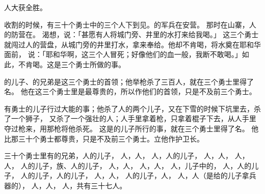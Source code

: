 {{{{}}}人大获全胜。
\par }{\PP {}收割的时候，有三十个勇士中的三个人下到{}见{}。{}的军兵在{}安营。
那时{}在山寨，{}人的防营在{}。
渴想，说：「甚愿有人将{}城门旁、井里的水打来给我喝。」
这三个勇士就闯过{}人的营盘，从{}城门旁的井里打水，拿来奉给{}。他却不肯喝，将水奠在耶和华面前，
说：「耶和华啊，这三个人冒死{}；{}好像他们的血一般，我断不敢喝。」如此，{}不肯喝。这是三个勇士所做的事。
\par }{\PP {}的儿子、{}的兄弟{}是这三个勇士的首领；他举枪杀了三百人，就在三个勇士里得了名。
他在这三个勇士里是最尊贵的，所以作他们的首领，只是不及前三个勇士。
\par }{\PP {}有{}勇士{}的儿子{}行过大能的事；他杀了{}人{}的两个儿子，又在下雪的时候下坑里去，杀了一个狮子，
又杀了一个强壮的{}人；{}人手里拿着枪，{}只拿着棍子下去，从{}人手里夺过枪来，用那枪将他杀死。
这是{}的儿子{}所行的事，就在三个勇士里得了名。
他比那三十个勇士都尊贵，只是不及前三个勇士。{}立他作护卫长。
\par }{\PP {}三十个勇士里有{}的兄弟{}，{}人{}的儿子{}，
人{}，{}人{}，
人{}，{}人{}的儿子{}，
人{}，{}人{}，
人{}，{}人{}，
人{}的儿子{}，{}族、{}人{}的儿子{}，
人{}，{}人{}，
人{}，{}人{}，
人{}，{}儿子中的{}，
人{}，{}人{}的儿子{}，
人{}的儿子{}，{}人{}的儿子{}，
人{}，{}人{}，
人{}的儿子{}，{}人{}，
人{}，{}人{}（是给{}的儿子{}拿兵器的），
人{}，{}人{}，
人{}，共有三十七人。

}
